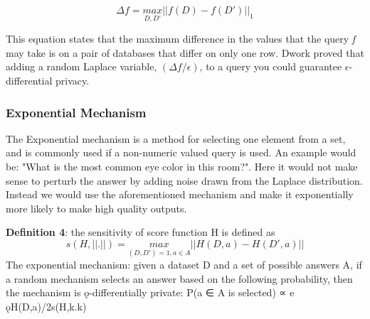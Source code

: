 $$\Delta \mathit{f}=\underset{D,D'}{max}||\mathit{f(D)}-\mathit{f(D')}||_{1}$$

This equation states that the maximum difference in the values that the query \textit{f} may take is on a pair of databases that differ on only one row. Dwork proved that adding a random Laplace variable, $(\Delta f/\epsilon)$, to a query you could guarantee $\epsilon$-differential privacy\cite{dwork2013algorithmic}. 

\subsubsection{Exponential Mechanism}
The Exponential mechanism is a method for selecting one element from a set, and is commonly used if a non-numeric valued query is used. An example would be: "What is the most common eye color in this room?". Here it would not make sense to perturb the answer by adding noise drawn from the Laplace distribution. Instead we would use the aforementioned mechanism and make it exponentially more likely to make high quality outputs. 

\textbf{Definition 4}: the sensitivity of score function H is defined as
$$s(H, ||.||) = \underset{(D,D′)=1,a\in A}{max}||H(D, a)-H(D',a)||$$
The exponential mechanism: given a dataset D and a set of possible answers
A, if a random mechanism selects an answer based on the following probability,
then the mechanism is ǫ-differentially private:
P(a ∈ A is selected) ∝ e
ǫH(D,a)/2s(H,k.k) 
\cleardoublepage
